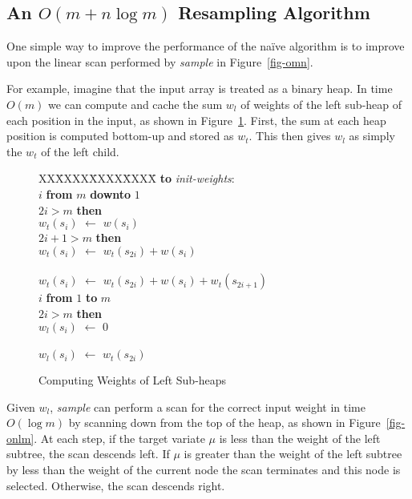 \documentclass[12pt]{article}
\newcommand{\asgn}{\,\,\leftarrow\,\,}
\begin{document}
\subsection{An $O(m + n \log m)$ Resampling Algorithm}

  One simple way to improve the performance of the na\"ive
  algorithm is to improve upon the linear scan performed by
  {\em sample} in Figure~\ref{fig-omn}.

  For example, imagine that the input array is treated as a
  binary heap.  In time $O(m)$ we can compute and cache the
  sum $w_l$ of weights of the left sub-heap of each position
  in the input, as shown in Figure~\ref{fig-heap}.  First,
  the sum at each heap position is computed bottom-up and
  stored as $w_t$.  This then gives $w_l$ as simply the
  $w_t$ of the left child.

  \begin{figure}
    \centering
    \begin{minipage}{0.6\textwidth}
      \begin{tabbing}
      XX\=XXXX\=XXXX\=XXXX\=\kill
      {\bf to} {\it init-weights}: \\
       $i$ {\bf from} $m$ {\bf downto} $1$\\
      \> $2i > m$ {\bf then}\\
      \>\>\>$w_t(s_i) \asgn w(s_i)$\\
      \> $2i + 1 > m$ {\bf then}\\
      \>\>\>$w_t(s_i) \asgn w_t(s_{2i}) + w(s_i)$\\
      \>\\
      \>\>\>$w_t(s_i) \asgn w_t(s_{2i}) + w(s_i) + w_t(s_{2i+1})$\\
       $i$ {\bf from} $1$ {\bf to} $m$\\
      \> $2i > m$ {\bf then}\\
      \>\>\>$w_l(s_i) \asgn 0$\\
      \>\\
      \>\>\>$w_l(s_i) \asgn w_t(s_{2i})$
    \end{tabbing}
    \end{minipage}
    \caption{Computing Weights of Left Sub-heaps}\label{fig-heap}
  \end{figure}

  Given $w_l$, {\em sample} can perform a scan for the
  correct input weight in time $O(\log m)$ by scanning down
  from the top of the heap, as shown in
  Figure~\ref{fig-onlm}.  At each step, if the target
  variate $\mu$ is less than the weight of the left subtree,
  the scan descends left.  If $\mu$ is greater than the
  weight of the left subtree by less than the weight of the
  current node the scan terminates and this node is
  selected.  Otherwise, the scan descends right.
\end{document}
